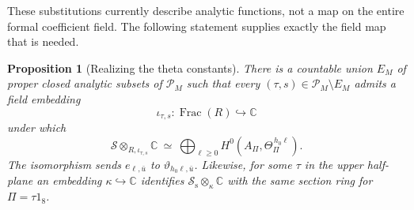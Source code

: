 \documentclass[11pt]{article}
\newtheorem{proposition}[theorem]{Proposition}
\theoremstyle{definition}
\theoremstyle{remark}
\newcommand{\C}{\mathbb C}
\numberwithin{equation}{section}
\begin{document}
These substitutions currently describe analytic functions, not a map
on the entire formal coefficient field.  The following statement supplies
exactly the field map that is needed.

\begin{proposition}[Realizing the theta constants]\label{theta:realization}
There is a countable union $E_M$ of proper closed analytic subsets of
$\mathcal P_M$ such that every $(\tau,s)\in\mathcal P_M\setminus E_M$
admits a field embedding
\[
 \iota_{\tau,s}:\operatorname{Frac}(R)\hookrightarrow\C
\]
under which
\begin{equation}\label{theta:generic-section-ring}
 \mathscr S\otimes_{R,\iota_{\tau,s}}\C
 \ \simeq\
 \bigoplus_{\ell\geq0}
       H^0(A_\Pi,\Theta_\Pi^{\,h_0\ell}).
\end{equation}
The isomorphism sends $e_{\ell,\bar u}$ to
$\vartheta_{h_0\ell,\bar u}$.  Likewise, for some
$\tau$ in the upper half-plane an embedding $\kappa\hookrightarrow\C$
identifies $\mathscr S_{\mathrm s}\otimes_\kappa\C$ with the same section
ring for $\Pi=\tau1_8$.
\end{proposition}
\end{document}
